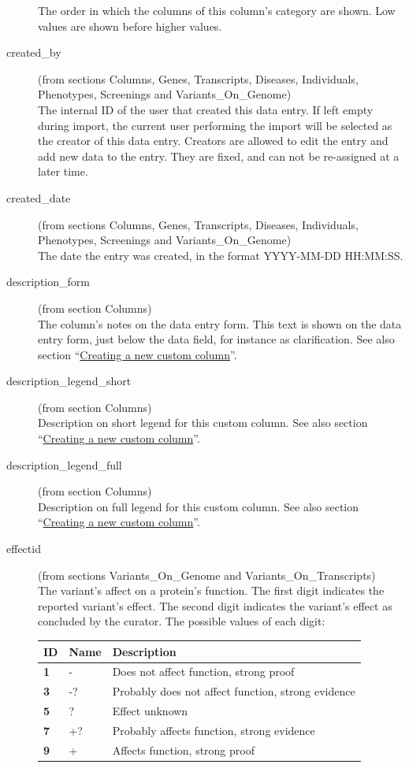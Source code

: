 \documentclass[a4paper,oneside,openany,12pt]{memoir}
\begin{document}
\begin{description}
  The order in which the columns of this column's category are shown.
  Low values are shown before higher values.
  \item[created\_by] (from sections Columns, Genes, Transcripts, Diseases, Individuals, Phenotypes, Screenings and Variants\_On\_Genome)\hfill \\
  The internal ID of the user that created this data entry.
  If left empty during import, the current user performing the import will be selected as the creator of this data entry.
  Creators are allowed to edit the entry and add new data to the entry.
  They are fixed, and can not be re-assigned at a later time.
  \item[created\_date] (from sections Columns, Genes, Transcripts, Diseases, Individuals, Phenotypes, Screenings and Variants\_On\_Genome)\hfill \\
  The date the entry was created, in the format YYYY-MM-DD HH:MM:SS.
  \item[description\_form] (from section Columns)\hfill \\
  The column's notes on the data entry form.
  This text is shown on the data entry form, just below the data field, for instance as clarification.
  See also section ``\hyperlink{sec:custom_column_create}{Creating a new custom column}''.
  \item[description\_legend\_short] (from section Columns)\hfill \\
  Description on short legend for this custom column.
  See also section ``\hyperlink{sec:custom_column_create}{Creating a new custom column}''.
  \item[description\_legend\_full] (from section Columns)\hfill \\
  Description on full legend for this custom column.
  See also section ``\hyperlink{sec:custom_column_create}{Creating a new custom column}''.
  \item[effectid] (from sections Variants\_On\_Genome and Variants\_On\_Transcripts)\hfill \\
  The variant's affect on a protein's function.
  The first digit indicates the reported variant's effect.
  The second digit indicates the variant's effect as concluded by the curator.
  The possible values of each digit:\\
  \begin{tabular}{>{\bfseries}p{0.6cm} p{2.3cm} p{11.7cm}}
    ID & \textbf{Name} & \textbf{Description}\\ \hline \hline
    1 & - & Does not affect function, strong proof\\ \hline
    3 & -? & Probably does not affect function, strong evidence\\ \hline
    5 & ? & Effect unknown\\ \hline
    7 & +? & Probably affects function, strong evidence\\ \hline
    9 & + & Affects function, strong proof\\ \hline
  \end{tabular}


\end{description}
\end{document}

